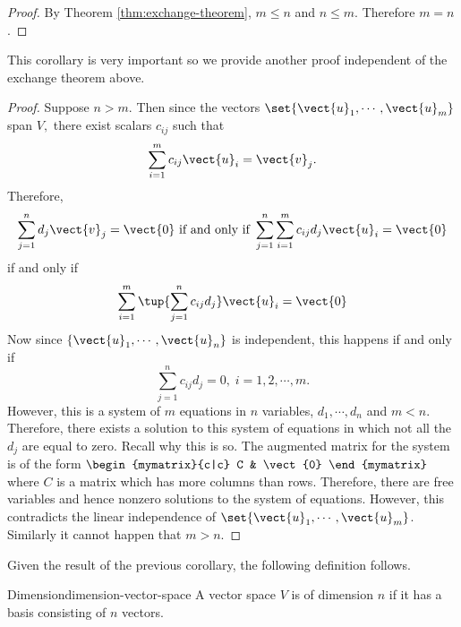 \begin{proof} By Theorem \ref{thm:exchange-theorem}, $m\leq n$ and $n\leq m$. Therefore $m=n$. 
\end{proof}

This corollary is very important so we provide another proof independent of the exchange theorem above.

\begin{proof}Suppose $n > m.$ Then since the vectors $\set{\vect{u}
_{1},\cdots ,\vect{u}_{m}} $ span $V,$ there exist scalars $c_{ij}$
such that 
\begin{equation*}
\sum_{i=1}^{m}c_{ij}\vect{u}_{i}=\vect{v}_{j}.
\end{equation*}
Therefore, 
\begin{equation*}
\sum_{j=1}^{n}d_{j}\vect{v}_{j}=\vect{0}
\text{ if and only if }\sum_{j=1}^{n}\sum_{i=1}^{m}c_{ij}d_{j}\vect{u}_{i}=
\vect{0}
\end{equation*}
if and only if 
\begin{equation*}
\sum_{i=1}^{m}\tup{\sum_{j=1}^{n}c_{ij}d_{j}} \vect{u}_{i}=\vect{
0}
\end{equation*}
Now since $\{\vect{u}_{1},\cdots ,\vect{u}_{n}\}$ is independent, this
happens if and only if 
\begin{equation*}
\sum_{j=1}^{n}c_{ij}d_{j}=0,\;i=1,2,\cdots ,m.
\end{equation*}
However, this is a system of $m$ equations in $n$ variables, $d_{1},\cdots
,d_{n}$ and $m<n.$ Therefore, there exists a solution to this system of
equations in which not all the $d_{j}$ are equal to zero. Recall why this is
so. The augmented matrix for the system is of the form 
$\begin{mymatrix}{c|c}
C & \vect{0}
\end{mymatrix} $ where $C$ is a matrix which has more columns than rows. Therefore,
there are free variables and hence nonzero solutions to the system of
equations. However, this contradicts the linear independence of $\set{
\vect{u}_{1},\cdots ,\vect{u}_{m}} $. Similarly it cannot happen
that $m > n$.
\end{proof}

Given the result of the previous corollary, the following definition follows.

\begin{definition}{Dimension}{dimension-vector-space}
 A vector space $V$ is of dimension $n$ if it has a basis consisting of $n$ vectors.
\end{definition}

